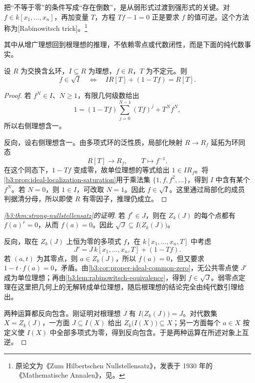 把“不等于零”的条件写成“存在倒数”，是从弱形式过渡到强形式的关键。对 \(f\in k[x_1,\ldots,x_n]\)，再加变量 \(T\)，方程 \(Tf-1=0\) 正是要求 \(f\) 的值可逆。这个方法称为[Rabinowitsch trick]。\footnote{原论文为《Zum Hilbertschen Nullstellensatz》，发表于 1930 年的《Mathematische Annalen》，见\cite{Rabinowitsch1930Nullstellensatz}。}

其中从增广理想回到根理想的推理，不依赖零点或代数闭性，而是下面的纯代数事实。

\begin{lemma}\label{b3:lem:rabinowitsch-equivalence}
	设 \(R\) 为交换含幺环，\(I\subseteq R\) 为理想，\(f\in R\)，\(T\) 为不定元。则
	\[
		f\in\sqrt I \quad\Longleftrightarrow\quad IR[T]+(1-Tf)=R[T].
	\]
\end{lemma}
\begin{proof}
	若 \(f^N\in I\)、\(N\ge1\)，有限几何级数给出
	\[
		1=(1-Tf)\sum_{j=0}^{N-1}(Tf)^j+T^Nf^N,
	\]
	所以右侧理想含一。

	反向，设右侧理想含一。由多项式环的泛性质，局部化映射 \(R\to R_f\) 延拓为环同态
	\[
		R[T]\longrightarrow R_f,\qquad T\longmapsto f^{-1}.
	\]
	在这个同态下，\(1-Tf\) 变成零，故单位理想的等式给出 \(1\in IR_f\)。将\cref{b3:prop:ideal-localization-saturation}用于乘法集 \(\{1,f,f^2,\ldots\}\)，得到 \(I\) 中含有某个 \(f^N\)。若 \(N=0\)，则 \(1\in I\)，可改取 \(N=1\)。因此 \(f\in\sqrt I\)。这里通过局部化的成员判据清分母，所以即使 \(R\) 有零因子，推理仍成立。
\end{proof}

\begin{proof}[\cref{b3:thm:strong-nullstellensatz}的证明]
	若 \(f^r\in J\)，则在 \(Z_k(J)\) 的每个点都有 \(f(a)^r=0\)，从而 \(f(a)=0\)。因此 \(\sqrt J\subseteq I\bigl(Z_k(J)\bigr)\)。

	反向，取在 \(Z_k(J)\) 上恒为零的多项式 \(f\)，在 \(k[x_1,\ldots,x_n,T]\) 中考虑
	\[
		J' = J\,k[x_1,\ldots,x_n,T]+(1-Tf).
	\]
	若 \((a,t)\) 为其零点，则 \(a\in Z_k(J)\)，所以 \(f(a)=0\)，但又要求 \(1-t\cdot f(a)=0\)，矛盾。由\cref{b3:cor:proper-ideal-common-zero}，无公共零点使 \(J'\) 成为单位理想；再由\cref{b3:lem:rabinowitsch-equivalence}，得到 \(f\in\sqrt J\)。弱零点定理在这里把几何上的无解转成单位理想，随后根理想的结论完全由纯代数引理给出。

	两种运算都反向包含。刚证明对根理想 \(J\) 有 \(I\bigl(Z_k(J)\bigr)=J\)。对代数集 \(X=Z_k(J)\)，一方面 \(J\subseteq I(X)\) 给出 \(Z_k\bigl(I(X)\bigr)\subseteq X\)；另一方面每个 \(a\in X\) 按定义使 \(I(X)\) 中全部多项式为零，得到反向包含。于是两种运算在所述对象上互逆。
\end{proof}

